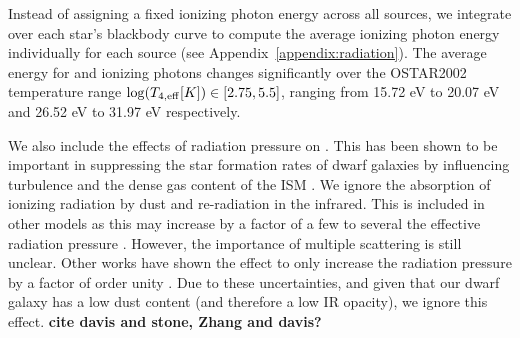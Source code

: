 \documentclass[twocolumn]{aastex61}
\begin{document}

Instead of assigning a fixed ionizing photon energy across all sources, we integrate over each star's blackbody curve to compute the average ionizing photon energy individually for each source (see Appendix~\ref{appendix:radiation}). The average energy for  and  ionizing photons changes significantly over the OSTAR2002 temperature range $\log(T_{4,\rm{eff}} [K]) \in \left[2.75,5.5\right]$, ranging from 15.72 eV to 20.07 eV and 26.52 eV to 31.97 eV respectively.

We also include the effects of radiation pressure on . This has been shown to be important in suppressing the star formation rates of dwarf galaxies by influencing turbulence and the dense gas content of the ISM \citep{WiseAbel2012,Ceverino2014}. We ignore the absorption of ionizing radiation by dust and re-radiation in the infrared. This is included in other models \citep[e.g.][]{Rosdahl2015,FIRE,FIRE2} as this may increase by a factor of a few to several the effective radiation pressure \citep{ZhangDavis2017}. However, the importance of multiple scattering is still unclear. Other works have shown the effect to only increase the radiation pressure by a factor of order unity \citep{Krumholz2012,Krumholz2013,Reissl2017}. Due to these uncertainties, and given that our dwarf galaxy has a low dust content (and therefore a low IR opacity), we ignore this effect. \textbf{cite davis and stone, Zhang and davis?}
\end{document}
